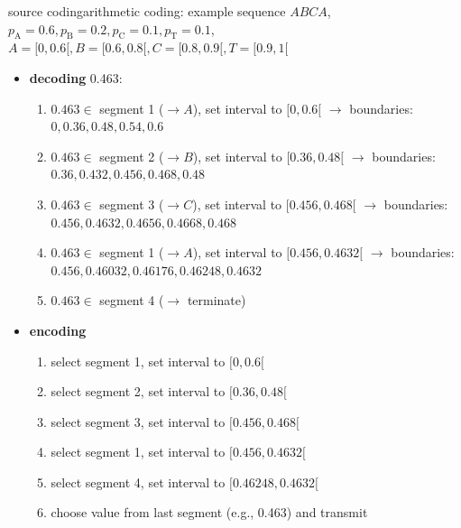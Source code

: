	\begin{frame}{source coding}{arithmetic coding: example}
            \vspace{-3mm}
            sequence $ABCA$, $p_\mathrm{A} = 0.6, p_\mathrm{B}= 0.2, p_\mathrm{C}=0.1, p_\mathrm{T}=0.1$, \mbox{\footnotesize $A = [0,0.6[, B= [0.6,0.8[, C=[0.8,0.9[, T=[0.9,1[$}
            \pause
				\begin{itemize}
					\item	\textbf{decoding} 0.463: 
                        \begin{enumerate}
							\item	$0.463 \in$ segment 1 ($\rightarrow A$), set interval to $[0,0.6[$ $ \rightarrow$ {boundaries: } {\footnotesize $0,0.36,0.48,0.54,0.6$}
							\pause
                            \item	$0.463 \in$ segment 2 ($\rightarrow B$), set interval to $[0.36,0.48[$ $ \rightarrow$ {boundaries: } {\footnotesize $0.36,0.432,0.456,0.468,0.48$}
							\pause
                            \item	$0.463 \in$ segment 3 ($\rightarrow C$), set interval to $[0.456,0.468[$ $ \rightarrow$ {boundaries: } {\footnotesize $0.456,0.4632,0.4656,0.4668,0.468$}
							\pause
                            \item	$0.463 \in$ segment 1 ($\rightarrow A$), set interval to $[0.456, 0.4632[$ $ \rightarrow$ {boundaries: } {\footnotesize $0.456,0.46032,0.46176,0.46248,0.4632$}
							\pause
                            \item   $0.463 \in$ segment 4 ($\rightarrow$ terminate)
						\end{enumerate}
					\pause
					\item \textbf{encoding} 
						\begin{enumerate}
							\item	select segment 1, set interval to $[0,0.6[$
							\pause
							\item	select segment 2, set interval to $[0.36,0.48[$
							\pause
							\item	select segment 3, set interval to $[0.456,0.468[$
							\pause
							\item	select segment 1, set interval to $[0.456, 0.4632[$
							\pause
                            \item   select segment 4, set interval to $[0.46248, 0.4632[$
							\pause
							\item   choose value from last segment (e.g., 0.463) and transmit
						\end{enumerate}
				\end{itemize}
	\end{frame}
		
